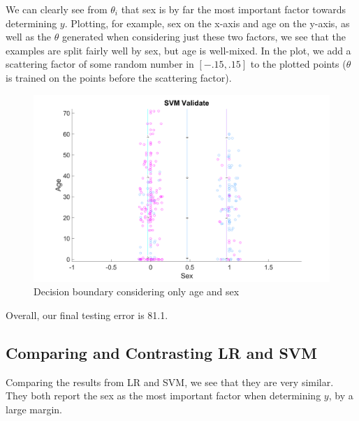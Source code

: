 \documentclass[10pt,letterpaper]{article}
\begin{document}
We can clearly see from $\theta_i$ that sex is by far the most important factor towards determining $y$. Plotting, for example, sex on the x-axis and age on the y-axis, as well as the $\theta$ generated when considering just these two factors, we see that the examples are split fairly well by sex, but age is well-mixed. In the plot, we add a scattering factor of some random number in $[-.15,.15]$ to the plotted points ($\theta$ is trained on the points before the scattering factor).

\begin{figure}[!htb]
\begin{center}
\includegraphics[width=.75\linewidth]{figures/sex_age_validate.png}
\caption{Decision boundary considering only age and sex}
\end{center}
\end{figure}

Overall, our final testing error is 81.1.

\subsection{Comparing and Contrasting LR and SVM}
Comparing the results from LR and SVM, we see that they are very similar. They both report the sex as the most important factor when determining $y$, by a large margin. 
\end{document}
